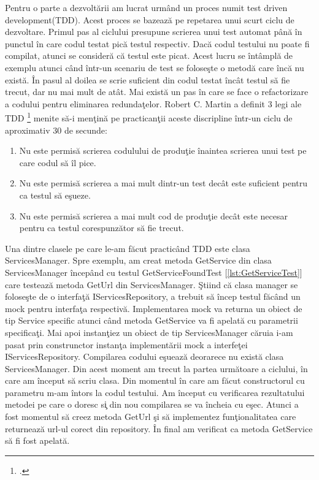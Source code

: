 \documentclass[a4paper,12pt]{report}
\let\oldref\ref
\renewcommand{\ref}[1]{[\oldref{#1}]}
\begin{document}
Pentru o parte a dezvolt\u arii am lucrat urm\^ and un proces numit test driven development(TDD).
Acest proces se bazeaz\u a pe repetarea unui scurt ciclu de dezvoltare. Primul pas al ciclului
presupune scrierea unui test automat p\^an\u a \^in punctul \^in care codul testat pic\u a testul respectiv.
Dac\u a codul testului nu poate fi compilat, atunci se consider\u a c\u a testul este picat. Acest lucru se \^int\^ampl\u a
de exemplu atunci c\^and \^intr-un scenariu de test se folose\c ste o metod\u a care \^inc\u a nu exist\u a.
\^In pasul al doilea se scrie suficient din codul testat \^inc\^at testul s\u a fie trecut, dar nu mai mult de at\^at.
Mai exist\u a un pas \^in care se face o refactorizare a codului pentru eliminarea redunda\c telor.
Robert C. Martin a definit 3 legi ale TDD \footcite{Martin:2011:CCC:1999258} menite s\u a-i men\c tin\u a pe practican\c tii 
aceste discripline \^intr-un ciclu de aproximativ 30 de secunde:
\begin{enumerate}
	\item Nu este permis\u a scrierea codulului de produ\c tie \^inaintea scrierea unui test pe care codul s\u a \^il 
	pice.
	\item Nu este permis\u a scrierea a mai mult dintr-un test dec\^at este suficient pentru ca testul s\u a e\c sueze.
	\item Nu este permis\u a scrierea a mai mult cod de produ\c tie dec\^at este necesar pentru ca testul corespunz\u ator 
	s\u a fie trecut. 
\end{enumerate}

Una dintre clasele pe care le-am f\u acut practic\^and TDD este clasa ServicesManager.
Spre exemplu, am creat metoda GetService din clasa ServicesManager \^incep\^and cu testul GetServiceFoundTest \ref{lst:GetServiceTest}
care testeaz\u a metoda GetUrl din ServicesManager.
\c Stiind c\u a clasa manager se folose\c ste de o interfa\c t\u a IServicesRepository, a trebuit s\u a \^incep testul f\u ac\^and 
un mock pentru interfa\c ta respectiv\u a. Implementarea mock va returna un obiect de tip Service specific atunci c\^and 
metoda GetService va fi apelat\u a cu parametrii specifica\c ti. Mai apoi instan\c tiez un obiect de tip ServicesManager c\u aruia i-am pasat 
prin construnctor instan\c ta implement\u arii mock a interfe\c tei IServicesRepository.
Compilarea codului e\c sueaz\u a deorarece nu exist\u a clasa ServicesManager.
Din acest moment am trecut la partea urm\u atoare a ciclului, \^in care am \^inceput s\u a scriu clasa.
Din momentul \^in care am f\u acut constructorul cu parametru m-am \^intors la codul testului.
Am \^inceput cu verificarea rezultatului metodei pe care o doresc s\c i din nou compilarea se va \^incheia cu e\c sec.
Atunci a fost momentul s\u a creez metoda GetUrl \c si s\u a implementez fun\c tionalitatea care returneaz\u a 
url-ul corect din repository.
\^In final am verificat ca metoda GetService s\u a fi fost apelat\u a.
\end{document}
